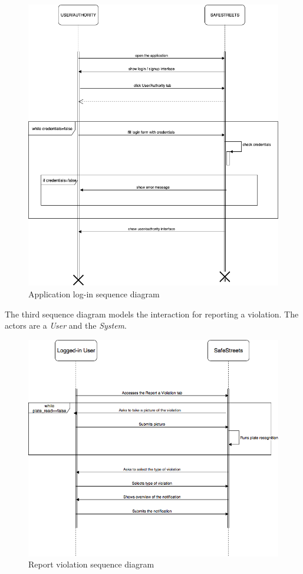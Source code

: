 \documentclass {article}
\begin{document}
		\begin{figure}[H]
			\centering
			\includegraphics[scale=0.55]{Images/Diagrams/sd_login.png}
			\caption{Application log-in sequence diagram}
		\end{figure}
		The third sequence diagram models the interaction for reporting a violation. The actors are a {\it User} and the {\it System}.
		\begin{figure}[H]
			\centering
			\includegraphics[scale=0.55]{Images/Diagrams/UC4-7.png}
			\caption{Report violation sequence diagram}
		\end{figure}
\end{document}
